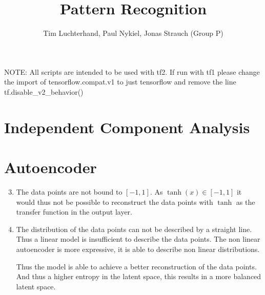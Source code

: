 \documentclass[DIN, pagenumber=false, fontsize=11pt, parskip=half]{scrartcl}
\title{Pattern Recognition}
\author{Tim Luchterhand, Paul Nykiel, Jonas Strauch (Group P)}
\begin{document}
    \maketitle
    NOTE: All scripts are intended to be used with tf2. If run with tf1 please change the import of tensorflow.compat.v1 to just tensorflow
    and remove the line tf.disable\_v2\_behavior()
    \section{Independent Component Analysis}

    \section{Autoencoder}
    \begin{enumerate}
        \setcounter{enumi}{2}
        \item The data points are not bound to $[-1, 1]$. As $\tanh(x) \in [-1, 1]$ it would thus not be possible
            to reconstruct the data points with $\tanh$ as the transfer function in the output layer.

        \item The distribution of the data points can not be described by a straight line. Thus a linear
            model is insufficient to describe the data points. The non linear autoencoder is more expressive,
            it is able to describe non linear distributions.
            
            Thus the model is able to achieve a better reconstruction of the data points. And thus a higher entropy
            in the latent space, this results in a more balanced latent space.
    \end{enumerate}
\end{document}
